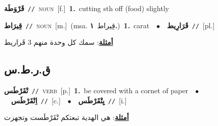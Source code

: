 \documentclass[10pt,a4paper,twoside]{article} %
\begin{document}
\begin{multicols}{2}
{\setlength\topsep{0pt}\textbf{\foreignlanguage{arabic}{قَرْوَطَة}}\ {\color{gray}\texttt{//}\color{black}}\ \textsc{noun}\ [f.]\ \textbf{1.}~cutting sth off (food) slightly\ } \vspace{2mm}

{\setlength\topsep{0pt}\textbf{\foreignlanguage{arabic}{قِيرَاط}}\ {\color{gray}\texttt{//}\color{black}}\ \textsc{noun}\ [m.]\ \color{gray}(msa. \foreignlanguage{arabic}{قِيراط}~\foreignlanguage{arabic}{\textbf{١.}})\color{black}\ \textbf{1.}~carat\ \ $\bullet$\ \ \setlength\topsep{0pt}\textbf{\foreignlanguage{arabic}{قَرَارِيط}}\ {\color{gray}\texttt{//}\color{black}}\ [pl.]\  \begin{flushright}\color{gray}\foreignlanguage{arabic}{\textbf{\underline{\foreignlanguage{arabic}{أمثلة}}}: سمك كل وحدة منهم 3 قَراريط}\end{flushright}\color{black}} \vspace{2mm}

\vspace{-3mm}
\subsection*{\color{blue}\foreignlanguage{arabic}{ق.ر.ط.س}\color{blue}{}} 

{\setlength\topsep{0pt}\textbf{\foreignlanguage{arabic}{تْقَرْطَس}}\ {\color{gray}\texttt{//}\color{black}}\ \textsc{verb}\ [p.]\ \textbf{1.}~be covered with a cornet of paper\ \ $\bullet$\ \ \setlength\topsep{0pt}\textbf{\foreignlanguage{arabic}{اِتْقَرْطَس}}\ {\color{gray}\texttt{//}\color{black}}\ [c.]\ \ $\bullet$\ \ \setlength\topsep{0pt}\textbf{\foreignlanguage{arabic}{يِتْقَرْطَس}}\ {\color{gray}\texttt{//}\color{black}}\ [i.]\  \begin{flushright}\color{gray}\foreignlanguage{arabic}{\textbf{\underline{\foreignlanguage{arabic}{أمثلة}}}: هي الهدية تبعتكم تْقَرْطَست وتجهزت}\end{flushright}\color{black}} \vspace{2mm}


\end{multicols}
\end{document}
